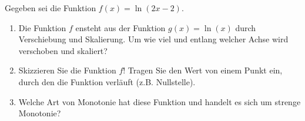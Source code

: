 \item Gegeben sei die Funktion $f(x) = \ln(2x-2)$.

\begin{enumerate}
\item Die Funktion $f$ ensteht aus der Funktion $g(x) = \ln(x)$ durch Verschiebung und Skalierung. Um wie viel und entlang welcher Achse wird verschoben und skaliert?
\item Skizzieren Sie die Funktion $f$! Tragen Sie den Wert von einem Punkt ein, durch den die Funktion verläuft (z.B. Nullstelle).
\item Welche Art von Monotonie hat diese Funktion und handelt es sich um strenge Monotonie?
\end {enumerate}
